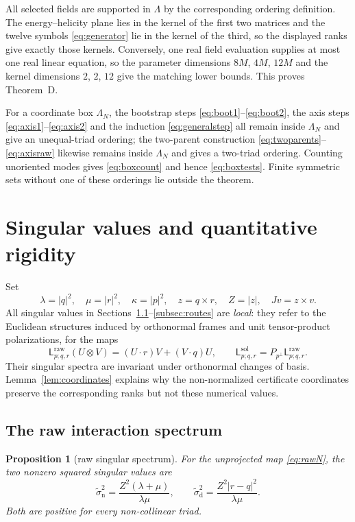 \documentclass[11pt]{article}
\newtheorem{proposition}[theorem]{Proposition}
\theoremstyle{definition}
\theoremstyle{remark}
\theoremstyle{plain}
\begin{document}
All selected fields are supported in $\Lambda$ by the corresponding ordering
definition. The energy--helicity plane lies in the kernel of the first two
matrices and the twelve symbols \eqref{eq:generator} lie in the kernel of the
third, so the displayed ranks give exactly those kernels. Conversely, one real
field evaluation supplies at most one real linear equation, so the parameter
dimensions $8M$, $4M$, $12M$ and the kernel dimensions $2$, $2$, $12$ give the
matching lower bounds. This proves Theorem~D.

For a coordinate box $\Lambda_{N}$, the bootstrap steps
\eqref{eq:boot1}--\eqref{eq:boot2}, the axis steps
\eqref{eq:axis1}--\eqref{eq:axis2} and the induction \eqref{eq:generalstep} all
remain inside $\Lambda_{N}$ and give an unequal-triad ordering; the two-parent
construction \eqref{eq:twoparents}--\eqref{eq:axisraw} likewise remains inside
$\Lambda_{N}$ and gives a two-triad ordering. Counting unoriented modes gives
\eqref{eq:boxcount} and hence \eqref{eq:boxtests}. Finite symmetric sets
without one of these orderings lie outside the theorem.

\section{Singular values and quantitative rigidity}
\label{sec:singular}

Set
\[
\lambda=|q|^{2},
\quad
\mu=|r|^{2},
\quad
\kappa=|p|^{2},
\quad
z=q\times r,
\quad
Z=|z|,
\quad
Jv=z\times v .
\]
All singular values in Sections~\ref{subsec:rawspec}--\ref{subsec:routes} are
\emph{local}: they refer to the Euclidean structures induced by orthonormal
frames and unit tensor-product polarizations, for the maps
\begin{equation}
\label{eq:localmaps}
\mathsf L^{\mathrm{raw}}_{p;q,r}(U\otimes V)
=(U\cdot r)V+(V\cdot q)U,
\qquad
\mathsf L^{\mathrm{sol}}_{p;q,r}
=P_{p^{\perp}}\mathsf L^{\mathrm{raw}}_{p;q,r} .
\end{equation}
Their singular spectra are invariant under orthonormal changes of basis.
Lemma~\ref{lem:coordinates} explains why the non-normalized certificate
coordinates preserve the corresponding ranks but not these numerical values.

\subsection{The raw interaction spectrum}
\label{subsec:rawspec}

\begin{proposition}[raw singular spectrum]
\label{prop:raw}
For the unprojected map \eqref{eq:rawN}, the two nonzero squared singular
values are
\begin{equation}
\label{eq:rawspec}
\widetilde\sigma_{\mathrm n}^{2}
=\frac{Z^{2}(\lambda+\mu)}{\lambda\mu},
\qquad
\widetilde\sigma_{\mathrm d}^{2}
=\frac{Z^{2}|r-q|^{2}}{\lambda\mu} .
\end{equation}
Both are positive for every non-collinear triad.
\end{proposition}
\end{document}
